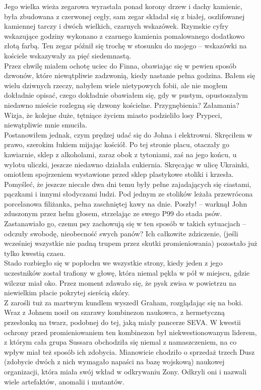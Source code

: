 \documentclass[../MAIN.tex]{subfiles}
\begin{document}
Jego wielka wieża zegarowa wyrastała ponad korony drzew i dachy kamienic, była zbudowana z czerwonej cegły, sam zegar składał się z białej, oszlifowanej kamiennej tarczy i dwóch wielkich, czarnych wskazówek. Rzymskie cyfry wskazujące godziny wykonano z czarnego kamienia pomalowanego dodatkowo złotą farbą. Ten zegar późnił się trochę w stosunku do mojego -- wskazówki na kościele wskazywały za pięć siedemnastą.\\
Przez chwilę miałem ochotę uciec do Finna, obawiając się w pewien sposób dzwonów, które niewątpliwie zadzwonią, kiedy nastanie pełna godzina. Bałem się wielu dziwnych rzeczy, nabyłem wiele nietypowych fobii, ale nie mogłem dokładnie opisać, czego dokładnie obawiałem się, gdy w pustym, opustoszałym niedawno mieście rozlegną się dzwony kościelne. Przygnębienia? Załamania? Wizja, że kolejne duże, tętniące życiem miasto podzieliło losy Prypeci, niewątpliwie mnie smuciła.\\
Postanowiłem jednak, czym prędzej udać się do Johna i elektrowni. Skręciłem w prawo, szerokim łukiem mijając kościół. Po tej stronie placu, otaczały go kawiarnie, sklep z alkoholami, zaraz obok z tytoniami, zaś na jego końcu, u wylotu uliczki, jeszcze niedawno działała cukiernia. Skręcając w ulicę Ukrainki, omiotłem spojrzeniem wystawione przed sklep plastykowe stoliki i krzesła.\\
Pomyśleć, że jeszcze niecałe dwa dni temu były pełne zajadających się ciastami, pączkami i innymi słodyczami ludzi. Pod jednym ze stolików leżała przewrócona porcelanowa filiżanka, pełna zaschniętej kawy na dnie.
% 
\sx Poszły! -- warknął John zduszonym przez hełm głosem, strzelając ze swego P99 do stada psów. 
\qd
Zastanawiało go, czemu psy zachowują się w ten sposób w takich sytuacjach -- odczuły swobodę, nieobecność swych panów? Ich całkowite zdziczenie, (jeśli wcześniej wszystkie nie padną trupem przez skutki promieniowania) pozostało już tylko kwestią czasu.\\
Stado rozbiegło się w popłochu we wszystkie strony, kiedy jeden z jego uczestników został trafiony w głowę, która niemal pękła w pół w miejscu, gdzie wilczur miał oko. Przez moment zdawało się, że pysk zwisa w powietrzu na niewielkim płacie pokrytej sierścią skóry.\\
Z zarośli tuż za martwym kundlem wyszedł Graham, rozglądając się na boki. Wraz z Johnem nosił on szarawy kombinezon naukowca, z hermetyczną przesłonką na twarz, podobnej do tej, jaką miały pancerze SEVA. W kwestii ochrony przed promieniowaniem ten kombinezon był niekwestionowanym liderem, z którym cała grupa Sussara obchodziła się niemal z namaszczeniem, na co wpływ miał też sposób ich zdobycia. Mianowicie chodziło o sprzedaż trzech Dusz (zdobycie dwóch z nich wymagało napaści na bazę wojskową) naukowej organizacji, która miała swój wkład w odkrywaniu Zony. Odkryli oni i nazwali wiele artefaktów, anomalii i mutantów.\\
\end{document}

